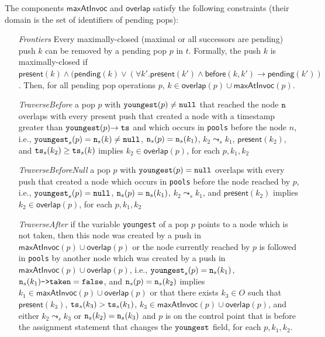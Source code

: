 The components $\mathsf{maxAtInvoc}$ and $\mathsf{overlap}$ satisfy the following constraints (their domain is the set of identifiers of pending pops):
\vspace{-2mm}
\begin{itemize}
\item[\emph{Frontiers}] Every maximally-closed (maximal or all successors are pending) push $k$ can be removed by a pending pop $p$ in $t$. Formally, the push $k$ is maximally-closed if $\mathsf{present}(k) \land (\mathsf{pending}(k) \lor (\forall k'. \mathsf{present}(k') \land \mathsf{before}(k,k') \rightarrow \mathsf{pending}(k'))$. Then, for all pending pop operations $p$, $k \in \mathsf{overlap}(p) \cup \mathsf{maxAtInvoc}(p)$.
	\item[\emph{TraverseBefore}] a pop $p$ with ${\tt youngest}(p)\neq {\tt null}$ that reached the node ${\tt n}$ overlaps with every present push that created a node with a timestamp greater than ${\tt youngest}(p){\tt ->ts}$ and which occurs in  {\tt pools} before the node $n$, i.e., ${\tt youngest}_s(p)= {\tt n}_s(k) \neq{\tt null}$, ${\tt n}_s(p)={\tt n}_s(k_1)$, $k_2\leadsto_s k_1$, $\mathsf{present}(k_2)$, and ${\tt ts}_s(k_2) \geq {\tt ts}_s(k)$ implies $k_2\in \mathsf{overlap}(p)$, for each $p, k_1, k_2$
	\item[\emph{TraverseBeforeNull}] a pop $p$ with ${\tt youngest}(p)={\tt null}$ overlaps with every push that created a node which occurs in {\tt pools} before the node reached by $p$,
i.e., ${\tt youngest}_s(p)={\tt null}$, ${\tt n}_s(p)={\tt n}_s(k_1)$, $k_2\leadsto_s k_1$, and $\mathsf{present}(k_2)$ implies $k_2\in \mathsf{overlap}(p)$, for each $p, k_1, k_2$
	\item[\emph{TraverseAfter}] if the variable {\tt youngest} of a pop $p$ points to a node which is not taken, then this node was created by a push in $\mathsf{maxAtInvoc}(p)\cup \mathsf{overlap}(p)$ or the node currently reached by $p$ is followed in {\tt pools} by another node which was created by a push in $\mathsf{maxAtInvoc}(p)\cup \mathsf{overlap}(p)$, i.e., ${\tt youngest}_s(p)={\tt n}_s(k_1)$, ${\tt n}_s(k_1)\text{{\tt ->taken}}={\tt false}$, and ${\tt n}_s(p)={\tt n}_s(k_2)$ implies $k_1\in \mathsf{maxAtInvoc}(p)\cup \mathsf{overlap}(p)$ or that there exists $k_3\in O$ such that $\mathsf{present}(k_3)$, ${\tt ts}_s(k_3) > {\tt ts}_s(k_1)$, $k_3\in \mathsf{maxAtInvoc}(p)\cup \mathsf{overlap}(p)$, and either $k_2\leadsto_s k_3$ or ${\tt n}_s(k_2)={\tt n}_s(k_3)$ and $p$ is on the control point that is before the assignment statement that changes the ${\tt youngest}$ field, for each $p, k_1,k_2$.
%	


\end{itemize}
